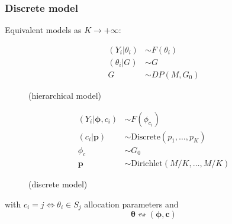 \begin{frame} %
	\frametitle{Discrete model}
Equivalent models as $ K\rightarrow +\infty$:
\begin{figure}[htpb] 
        \begin{align*}
            (Y_{i}|\theta_{i})&\sim F(\theta_{i}) \\
            (\theta_{i}|G)&\sim G \\
            G & \sim DP(M,G_{0})
        \end{align*}
        \begin{center}
        	(hierarchical model)
        \end{center}
\endminipage 
        \begin{align*}
            (Y_{i}|\mathbf{\phi},c_{i})&\sim F(\phi_{c_{i}}) \\
            (c_{i}|\mathit{\mathbf{p}})&\sim \text{Discrete}(\mathit{p_{1}},\dots,\mathit{p_{K}})\\
            \phi_{c} & \sim G_{0} \\
            \mathbf{p} &\sim \text{Dirichlet}(M/K,\dots,M/K) 
        \end{align*}
        \begin{center}
        	(discrete model)
        \end{center}
        
\endminipage  
\end{figure}
\begin{center}
	\vspace{20pt}
	with $c_i = j \iff \theta_i \in S_j$ allocation parameters and
	$$\boldsymbol\theta \leftrightsquigarrow (\boldsymbol\phi, \mathbf c)$$
\end{center}




\end{frame}




